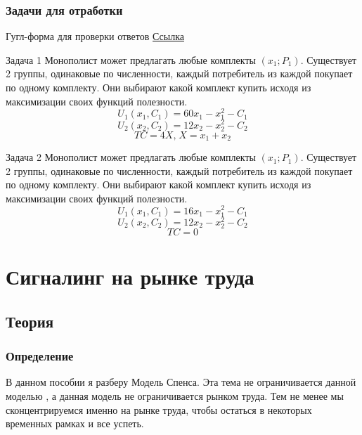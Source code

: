 \subsection{Задачи для отработки}

\begin{mybox}{Гугл-форма для проверки ответов}
    \href{https://forms.gle/Ka76oAsLQDdQsKNR9}{Ссылка}
\end{mybox}

\begin{mybox}{Задача 1}
    Монополист может предлагать любые комплекты $(x_1;P_1)$. Существует 2 группы, одинаковые по численности, каждый
    потребитель из каждой покупает по одному комплекту. Они выбирают какой комплект купить исходя из максимизации своих
    функций полезности. \\
    $$U_1(x_1,C_1)=60x_1-x_1^2-C_1$$
    $$U_2(x_2,C_2)=12x_2-x_2^2-C_2$$
    $$TC=4X\text{,}\;X=x_1+x_2$$
\end{mybox}

\begin{mybox}{Задача 2}
    Монополист может предлагать любые комплекты $(x_1;P_1)$. Существует 2 группы, одинаковые по численности, каждый потребитель из каждой покупает по одному комплекту. Они выбирают какой комплект купить исходя из максимизации своих функций полезности. \\
    $$U_1(x_1,C_1)=16x_1-x_1^2-C_1$$
    $$U_2(x_2,C_2)=12x_2-x_2^2-C_2$$
    $$TC=0$$
\end{mybox}

\newpage



\chapter{Сигналинг на рынке труда}


\section{Теория}

\subsection{Определение}

\indent\setlength{\parindent}{1em}В данном пособии я разберу Модель Спенса. Эта тема не ограничивается данной моделью
, а данная модель не ограничивается рынком труда. Тем не менее мы сконцентрируемся именно на рынке труда, чтобы
остаться в некоторых временных рамках и все успеть. \smallskip

